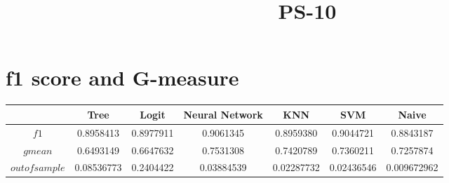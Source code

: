 \documentclass[12pt]{article}
\title{PS-10}
\begin{document}
\section{f1 score and G-measure}

\begin{tabular}{c|cccccc}
\hline\hline
 & Tree & Logit & Neural Network & KNN & SVM & Naive \\ \hline
$f1$ & 0.8958413 & 0.8977911 & 0.9061345 & 0.8959380 & 0.9044721 & 0.8843187 \\ \hline 
$gmean$ & 0.6493149 & 0.6647632 & 0.7531308 & 0.7420789 & 0.7360211 & 0.7257874 \\ \hline 
$out of sample$ & 0.08536773 & 0.2404422 &  0.03884539 & 0.02287732 & 0.02436546 & 0.009672962 \\ \hline
\end{tabular}


 
\end{document}
